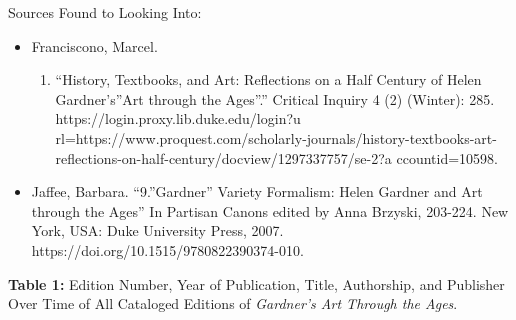 \documentclass[
  letterpaper,
  DIV=11,
  numbers=noendperiod]{scrreprt}
\providecommand{\tightlist}{%
  \setlength{\itemsep}{0pt}\setlength{\parskip}{0pt}}
\begin{document}
Sources Found to Looking Into:

\begin{itemize}
\tightlist
\item
  Franciscono, Marcel.

  \begin{enumerate}
  \def\labelenumi{\arabic{enumi}.}
  \setcounter{enumi}{1976}
  \tightlist
  \item
    ``History, Textbooks, and Art: Reflections on a Half Century of
    Helen Gardner's''Art through the Ages''.'' Critical Inquiry 4 (2)
    (Winter): 285. https://login.proxy.lib.duke.edu/login?u
    rl=https://www.proquest.com/scholarly-journals/history-textbooks-art-reflections-on-half-century/docview/1297337757/se-2?a
    ccountid=10598.
  \end{enumerate}
\item
  Jaffee, Barbara. ``9.''Gardner'' Variety Formalism: Helen Gardner and
  Art through the Ages'' In Partisan Canons edited by Anna Brzyski,
  203-224. New York, USA: Duke University Press, 2007.
  https://doi.org/10.1515/9780822390374-010.
\end{itemize}

\textbf{Table 1:} Edition Number, Year of Publication, Title,
Authorship, and Publisher Over Time of All Cataloged Editions of
\emph{Gardner's Art Through the Ages}.
\end{document}
